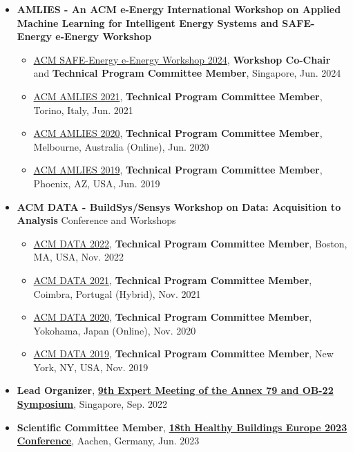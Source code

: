 \documentclass[10pt,a4paper]{article}
\begin{document}
\begin{small}
\begin{itemize}
\item
\textbf{AMLIES - An ACM e-Energy International Workshop on Applied Machine Learning for Intelligent Energy Systems and SAFE-Energy e-Energy Workshop}
\begin{itemize}
\item \href{https://safe-energy-workshop.github.io}{ACM SAFE-Energy e-Energy Workshop 2024}, \textbf{Workshop Co-Chair} and \textbf{Technical Program Committee Member}, Singapore, Jun. 2024
\item \href{https://sinberbest.berkeley.edu/amlies/2021}{ACM AMLIES 2021}, \textbf{Technical Program Committee Member}, Torino, Italy, Jun. 2021
\item \href{https://sinberbest.berkeley.edu/amlies/2020}{ACM AMLIES 2020}, \textbf{Technical Program Committee Member}, Melbourne, Australia (Online), Jun. 2020
\item \href{https://sinberbest.berkeley.edu/amlies/2019}{ACM AMLIES 2019}, \textbf{Technical Program Committee Member}, Phoenix, AZ, USA, Jun. 2019
\end{itemize}

\item
\textbf{ACM DATA - BuildSys/Sensys Workshop on Data: Acquisition to Analysis} Conference and Workshops
\begin{itemize}
\item \href{https://data-workshop.github.io/DATA2022/}{ACM DATA 2022}, \textbf{Technical Program Committee Member}, Boston, MA, USA, Nov. 2022
\item \href{https://data-workshop.github.io/DATA2021/}{ACM DATA 2021}, \textbf{Technical Program Committee Member}, Coimbra, Portugal (Hybrid), Nov. 2021
\item \href{https://workshopdata.github.io/DATA2020/}{ACM DATA 2020}, \textbf{Technical Program Committee Member}, Yokohama, Japan (Online), Nov. 2020
\item \href{https://workshopdata.github.io/DATA2019/}{ACM DATA 2019}, \textbf{Technical Program Committee Member}, New York, NY, USA, Nov. 2019
\end{itemize}


\item
\textbf{Lead Organizer}, \textbf{\href{https://annex79-2022-sg.github.io/}{9th Expert Meeting of the Annex 79 and OB-22 Symposium}}, Singapore, Sep. 2022
\item
\textbf{Scientific Committee Member}, \textbf{\href{https://www.ukaachen.de/kliniken-institute/hb2023-europe/about/welcome-to-hb-europe-2023/}{18th Healthy Buildings Europe 2023 Conference}}, Aachen, Germany, Jun. 2023


\end{itemize}
\end{small}
\end{document}
